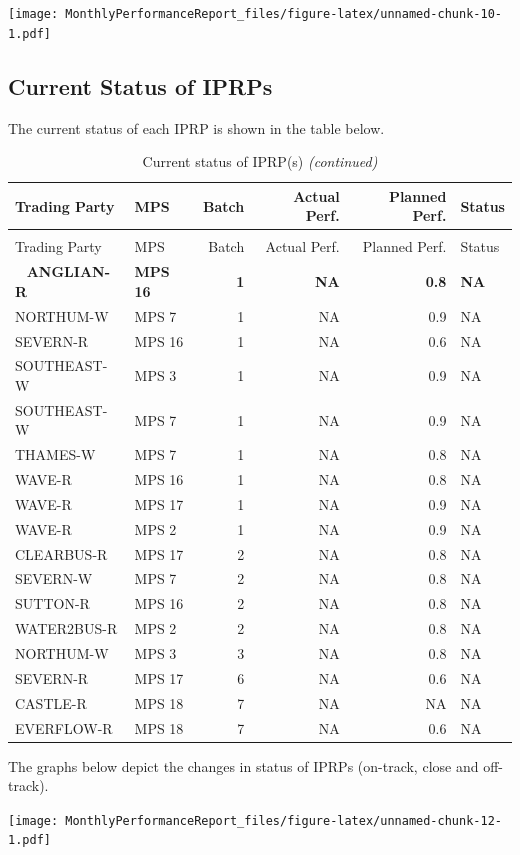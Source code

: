 \documentclass[12pt,table]{article}
\begin{document}
\texttt{[image: MonthlyPerformanceReport\_files/figure-latex/unnamed-chunk-10-1.pdf]}

\newpage

\hypertarget{current-status-of-iprps}{%
\subsection{Current Status of IPRPs}\label{current-status-of-iprps}}

The current status of each IPRP is shown in the table below.

\begin{longtable}[t]{llrrrl}
\caption{\label{tab:unnamed-chunk-11}Current status of IPRP(s)}\\
\toprule
Trading Party & MPS & Batch & Actual Perf. & Planned Perf. & Status\\
\midrule
\endfirsthead
\caption[]{Current status of IPRP(s) \textit{(continued)}}\\
\toprule
Trading Party & MPS & Batch & Actual Perf. & Planned Perf. & Status\\
\midrule
\endhead
\
\endfoot
\bottomrule
\endlastfoot
\rowcolor{gray!6}  \textbf{ANGLIAN-R} & \textbf{MPS 16} & \textbf{1} & \textbf{NA} & \textbf{0.8} & \textbf{NA}\\
NORTHUM-W & MPS 7 & 1 & NA & 0.9 & NA\\
\rowcolor{gray!6}  SEVERN-R & MPS 16 & 1 & NA & 0.6 & NA\\
SOUTHEAST-W & MPS 3 & 1 & NA & 0.9 & NA\\
\rowcolor{gray!6}  SOUTHEAST-W & MPS 7 & 1 & NA & 0.9 & NA\\
THAMES-W & MPS 7 & 1 & NA & 0.8 & NA\\
\rowcolor{gray!6}  WAVE-R & MPS 16 & 1 & NA & 0.8 & NA\\
WAVE-R & MPS 17 & 1 & NA & 0.9 & NA\\
\rowcolor{gray!6}  WAVE-R & MPS 2 & 1 & NA & 0.9 & NA\\
CLEARBUS-R & MPS 17 & 2 & NA & 0.8 & NA\\
\rowcolor{gray!6}  SEVERN-W & MPS 7 & 2 & NA & 0.8 & NA\\
SUTTON-R & MPS 16 & 2 & NA & 0.8 & NA\\
\rowcolor{gray!6}  WATER2BUS-R & MPS 2 & 2 & NA & 0.8 & NA\\
NORTHUM-W & MPS 3 & 3 & NA & 0.8 & NA\\
\rowcolor{gray!6}  SEVERN-R & MPS 17 & 6 & NA & 0.6 & NA\\
CASTLE-R & MPS 18 & 7 & NA & NA & NA\\
\rowcolor{gray!6}  EVERFLOW-R & MPS 18 & 7 & NA & 0.6 & NA\\*
\end{longtable}

The graphs below depict the changes in status of IPRPs (on-track, close
and off-track).

\texttt{[image: MonthlyPerformanceReport\_files/figure-latex/unnamed-chunk-12-1.pdf]}
\end{document}
